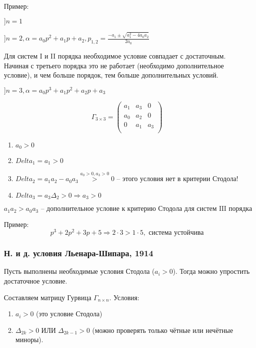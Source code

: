 \documentclass[main.tex]{subfiles}
\begin{document}
Пример:

$ ] n = 1 $ %

$ ] n = 2, \alpha = a_0 p^2 + a_1 p + a_2, p_{1,2} = \frac{-a_1 \pm \sqrt{a_1^2 - 4a_0 a_2}}{2a_0} $
\begin{leftbar}
	Для систем I и II порядка необходимое условие совпадает с достаточным.
	Начиная с третьего порядка это не работает (необходимо дополнительное условие), и чем больше порядок, тем больше дополнительных условий.
\end{leftbar}

$ ] n = 3, \alpha = a_0 p^3 + a_1 p^2 + a_2 p + a_3 $

$$ \Gamma_{3\times3} = \begin{pmatrix}
a_1 & a_3 & 0 \\
a_0 & a_2 & 0 \\
0   & a_1 & a_3 \\
\end{pmatrix} $$

\begin{enumerate}[noitemsep]
	\item $ a_0 > 0 $
	\item $ Delta_1 = a_1 > 0 $
	\item $ Delta_2 = a_1 a_2 - a_0 a_3 \overset{a_0 > 0, a_3 > 0} > 0 $ -- этого условия нет в критерии Стодола!
	\item $ Delta_3 = a_3 \Delta_2 > 0 \Rightarrow a_3 > 0 $ 
\end{enumerate}

$$ \boxed{a_1 a_2 > a_0 a_3} \text{ -- дополнительное условие к критерию Стодола для систем III порядка} $$

Пример:
$$ p^3 + 2 p^2 + 3p + 5 \Rightarrow 2 \cdot 3 > 1 \cdot 5, \text{ система устойчива} $$

\subsubsection{Н. и д. условия Льенара-Шипара, 1914}

Пусть выполнены необходимые условия Стодола ($ a_i > 0 $).
Тогда можно упростить достаточное условие.

Составляем матрицу Гурвица $ \Gamma_{n \times n}  $.
Условия:

\begin{enumerate}[noitemsep]
	\item $ a_i > 0 $ (это условие Стодола)
	\item $ \Delta_{2k} > 0 $ ИЛИ $ \Delta_{2k-1} > 0 $ (можно проверять только чётные или нечётные миноры).
\end{enumerate}
\end{document}
